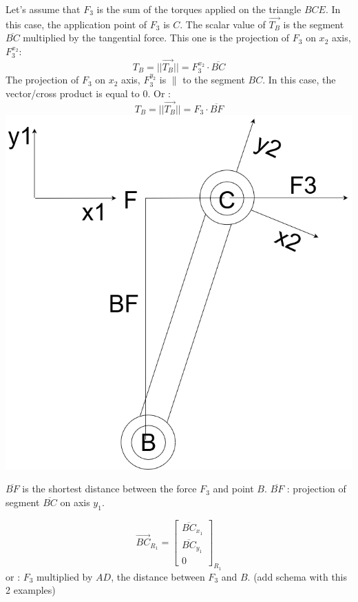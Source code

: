 \documentclass[12pt,a4paper]{article}
\begin{document}
	Let's assume that $F_3$ is the sum of the torques applied on the triangle $BCE$. In this case, the application point of $F_3$ is $C$. The scalar value of $\vec{T_B}$ is  the segment $\overline{BC}$ multiplied by the tangential force. This one is the projection of $F_3$ on $x_2$ axis, $F_3^{x_2}$:
	\begin{equation}
		T_B=||\vec{T_B}|| = F_3^{x_2} \cdot \overline{BC}
	\end{equation}
	The projection of $F_3$ on $x_2$ axis, $F_3^{y_2}$ is $\parallel$ to the segment $BC$. In this case, the vector/cross product is equal to $0$.
	Or : 
	\begin{equation}
		T_B=||\vec{T_B}|| = F_3 \cdot \overline{BF}
	\end{equation}
	\includegraphics[scale=.35]{BCF.drawio.png}
	
	$\overline{B F}$ is the shortest distance between the force $F_3$ and point $B$.
	$\overline{B F}$ : projection of segment $\overline{BC}$ on axis $y_1$. 
	
	\begin{equation}
		\vec{BC}_{R_{1}}=
		\begin{bmatrix}
			\overline{BC}_{x_1} \\
			\overline{BC}_{y_1}\\
			0
		\end{bmatrix}_{R_{1}} 
	\end{equation}
	or : $F_3$ multiplied by $AD$, the distance between $F_3$ and $B$. (add schema with this 2 examples)
	
\end{document}
